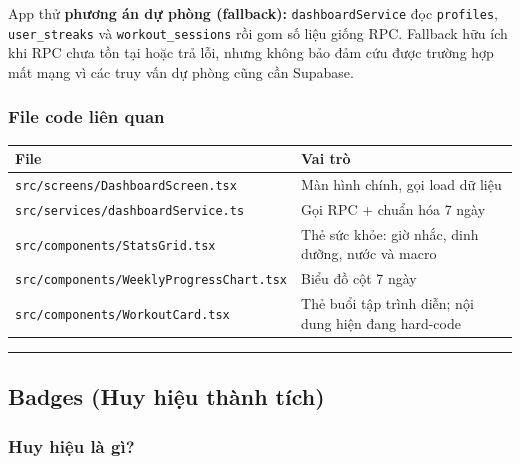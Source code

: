 \documentclass[12pt,a4paper]{article}
\newcounter{none}
\begin{document}
App thử \textbf{phương án dự phòng (fallback):}
\texttt{dashboardService} đọc \texttt{profiles}, \texttt{user\_streaks}
và \texttt{workout\_sessions} rồi gom số liệu giống RPC. Fallback hữu
ích khi RPC chưa tồn tại hoặc trả lỗi, nhưng không bảo đảm cứu được
trường hợp mất mạng vì các truy vấn dự phòng cũng cần Supabase.

\subsubsection{File code liên quan}\label{file-code-liuxean-quan}

{\def\LTcaptype{none} %
\begin{longtable}[]{@{}
  >{\raggedright\arraybackslash}p{}
  >{\raggedright\arraybackslash}p{}@{}}
\toprule\noalign{}
\begin{minipage}[b]{\linewidth}\raggedright
File
\end{minipage} & \begin{minipage}[b]{\linewidth}\raggedright
Vai trò
\end{minipage} \\
\midrule\noalign{}
\endhead
\bottomrule\noalign{}
\endlastfoot
\texttt{src/screens/DashboardScreen.tsx} & Màn hình chính, gọi load dữ
liệu \\
\texttt{src/services/dashboardService.ts} & Gọi RPC + chuẩn hóa 7
ngày \\
\texttt{src/components/StatsGrid.tsx} & Thẻ sức khỏe: giờ nhắc, dinh
dưỡng, nước và macro \\
\texttt{src/components/WeeklyProgressChart.tsx} & Biểu đồ cột 7 ngày \\
\texttt{src/components/WorkoutCard.tsx} & Thẻ buổi tập trình diễn; nội
dung hiện đang hard-code \\
\end{longtable}
}

\begin{center}\rule{0.5\linewidth}{0.5pt}\end{center}

\subsection{Badges (Huy hiệu thành
tích)}\label{badges-huy-hiux1ec7u-thuxe0nh-tuxedch}

\subsubsection{Huy hiệu là gì?}\label{huy-hiux1ec7u-luxe0-guxec}
\end{document}
